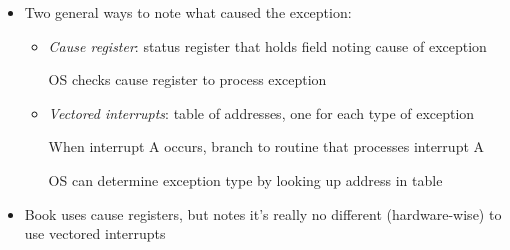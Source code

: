 \begin{frame}[fragile]
\begin{itemize}
	\item Two general ways to note what caused the exception:
	\begin{itemize}
		\item {\it Cause register}: status register that holds
			field noting cause of exception

			OS checks cause register to process exception

		\item {\it Vectored interrupts}: table of addresses,
			one for each type of exception

			When interrupt A occurs, branch to routine that
			processes interrupt A

			OS can determine exception type by looking up
			address in table
	\end{itemize}
	\item Book uses cause registers, but notes it's really no different (hardware-wise) to use vectored interrupts
\end{itemize}
\BNotes\ifnum{}
~
\fi\ENotes
\end{frame}



